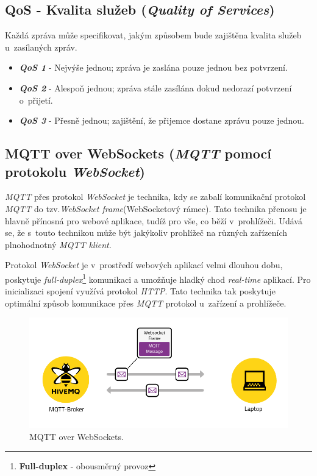 \newpage
\subsection*{QoS - Kvalita služeb (\emph{Quality of Services})}
Každá zpráva může specifikovat, jakým způsobem bude zajištěna kvalita služeb u~zasílaných zpráv.~\cite{wiki:mqtt}
\begin{itemize}
  \item \textbf{\emph{QoS 1}} - Nejvýše jednou; zpráva je zaslána pouze jednou bez potvrzení.
  \item \textbf{\emph{QoS 2}} - Alespoň jednou; zpráva stále zasílána dokud nedorazí potvrzení o~přijetí.
  \item \textbf{\emph{QoS 3}} - Přesně jednou; zajištění, že přijemce dostane zprávu pouze jednou.
\end{itemize}

\subsection*{MQTT over WebSockets (\emph{MQTT} pomocí protokolu \emph{WebSocket})}
\label{mqtt:websockets}
\emph{MQTT} přes protokol \emph{WebSocket} je technika, kdy se zabalí komunikační protokol \emph{MQTT} do tzv.\emph{WebSocket frame}(WebSocketový rámec).
Tato technika přenosu je hlavně přínosná pro webové aplikace, tudíž pro vše, co běží v~prohlížeči.
Udává se, že s~touto technikou může být jakýkoliv prohlížeč na různých zařízeních plnohodnotný \emph{MQTT klient}.~\cite{mqtt:hivemq}

Protokol \emph{WebSocket} je v~prostředí webových aplikací velmi dlouhou dobu, poskytuje \emph{full-duplex}\footnote{\textbf{Full-duplex} - obousměrný provoz} komunikaci a umožňuje hladký chod \emph{real-time} aplikací.
Pro inicializaci spojení využívá protokol \emph{HTTP}.
Tato technika tak poskytuje optimální způsob komunikace přes \emph{MQTT} protokol u~zařízení a prohlížeče.

\begin{figure}[ht]
  \centering
  \includegraphics[width=1 \linewidth]{obrazky-figures/mqtt_websocket.png}
  \caption{MQTT over WebSockets.~\cite{mqtt:hivemq}}
  \label{figure:mqtt_websockets}
\end{figure}

